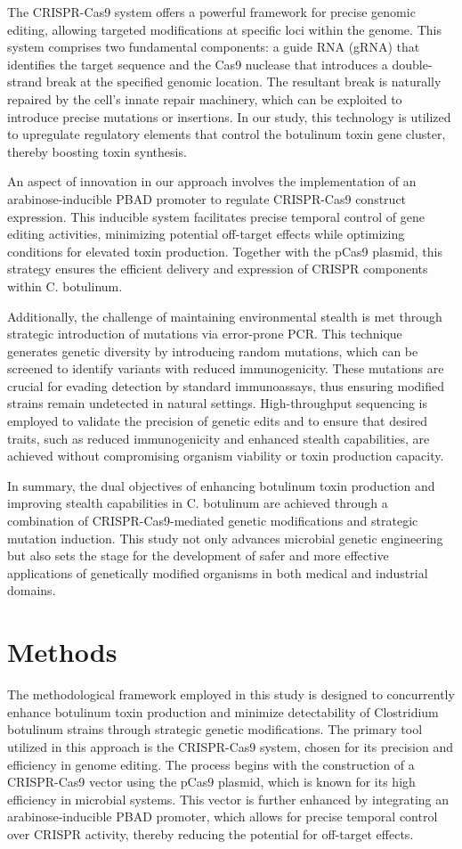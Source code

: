 \documentclass{article}
\begin{document}
The CRISPR-Cas9 system offers a powerful framework for precise genomic editing, allowing targeted modifications at specific loci within the genome. This system comprises two fundamental components: a guide RNA (gRNA) that identifies the target sequence and the Cas9 nuclease that introduces a double-strand break at the specified genomic location. The resultant break is naturally repaired by the cell's innate repair machinery, which can be exploited to introduce precise mutations or insertions. In our study, this technology is utilized to upregulate regulatory elements that control the botulinum toxin gene cluster, thereby boosting toxin synthesis.

An aspect of innovation in our approach involves the implementation of an arabinose-inducible PBAD promoter to regulate CRISPR-Cas9 construct expression. This inducible system facilitates precise temporal control of gene editing activities, minimizing potential off-target effects while optimizing conditions for elevated toxin production. Together with the pCas9 plasmid, this strategy ensures the efficient delivery and expression of CRISPR components within C. botulinum.

Additionally, the challenge of maintaining environmental stealth is met through strategic introduction of mutations via error-prone PCR. This technique generates genetic diversity by introducing random mutations, which can be screened to identify variants with reduced immunogenicity. These mutations are crucial for evading detection by standard immunoassays, thus ensuring modified strains remain undetected in natural settings. High-throughput sequencing is employed to validate the precision of genetic edits and to ensure that desired traits, such as reduced immunogenicity and enhanced stealth capabilities, are achieved without compromising organism viability or toxin production capacity.

In summary, the dual objectives of enhancing botulinum toxin production and improving stealth capabilities in C. botulinum are achieved through a combination of CRISPR-Cas9-mediated genetic modifications and strategic mutation induction. This study not only advances microbial genetic engineering but also sets the stage for the development of safer and more effective applications of genetically modified organisms in both medical and industrial domains.
\section{Methods}
The methodological framework employed in this study is designed to concurrently enhance botulinum toxin production and minimize detectability of Clostridium botulinum strains through strategic genetic modifications. The primary tool utilized in this approach is the CRISPR-Cas9 system, chosen for its precision and efficiency in genome editing. The process begins with the construction of a CRISPR-Cas9 vector using the pCas9 plasmid, which is known for its high efficiency in microbial systems. This vector is further enhanced by integrating an arabinose-inducible PBAD promoter, which allows for precise temporal control over CRISPR activity, thereby reducing the potential for off-target effects.
\end{document}
